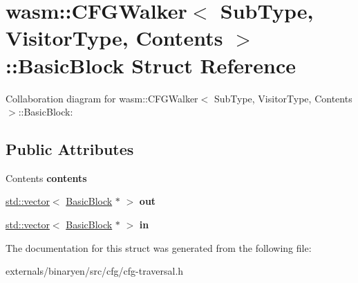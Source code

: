 \hypertarget{structwasm_1_1_c_f_g_walker_1_1_basic_block}{}\section{wasm\+:\+:C\+F\+G\+Walker$<$ Sub\+Type, Visitor\+Type, Contents $>$\+:\+:Basic\+Block Struct Reference}
\label{structwasm_1_1_c_f_g_walker_1_1_basic_block}


Collaboration diagram for wasm\+:\+:C\+F\+G\+Walker$<$ Sub\+Type, Visitor\+Type, Contents $>$\+:\+:Basic\+Block\+:
\subsection*{Public Attributes}
\begin{DoxyCompactItemize}
\item 
\mbox{\label{structwasm_1_1_c_f_g_walker_1_1_basic_block_a18bb02377172261e4086d34ae70e06c1}} 
Contents {\bfseries contents}
\item 
\mbox{\label{structwasm_1_1_c_f_g_walker_1_1_basic_block_a9faf00ca8cc2698832533a9304240d7b}} 
\mbox{\hyperlink{classstd_1_1vector}{std\+::vector}}$<$ \mbox{\hyperlink{structwasm_1_1_c_f_g_walker_1_1_basic_block}{Basic\+Block}} $\ast$ $>$ {\bfseries out}
\item 
\mbox{\label{structwasm_1_1_c_f_g_walker_1_1_basic_block_a31066960effdfdecb24735f7953e0b66}} 
\mbox{\hyperlink{classstd_1_1vector}{std\+::vector}}$<$ \mbox{\hyperlink{structwasm_1_1_c_f_g_walker_1_1_basic_block}{Basic\+Block}} $\ast$ $>$ {\bfseries in}
\end{DoxyCompactItemize}


The documentation for this struct was generated from the following file\+:\begin{DoxyCompactItemize}
\item 
externals/binaryen/src/cfg/cfg-\/traversal.\+h\end{DoxyCompactItemize}
